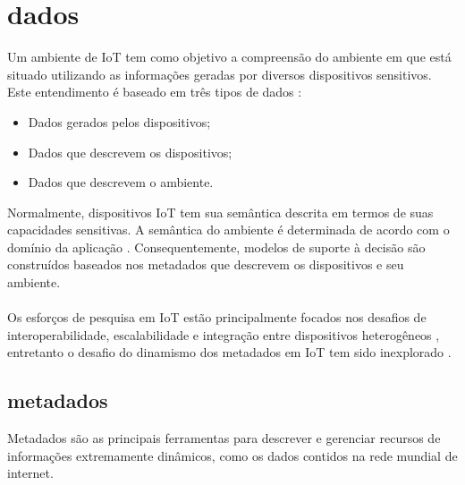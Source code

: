 \section{dados}%
	Um ambiente de \acrlong{IoT} tem como objetivo a compreensão do ambiente em que está situado utilizando as informações geradas por diversos
  dispositivos sensitivos.
   Este entendimento é baseado em três tipos de dados \cite{SemIOT}:
  \begin{itemize}
    \item Dados gerados pelos dispositivos;
    \item Dados que descrevem os dispositivos;
    \item Dados que descrevem o ambiente.
  \end{itemize}
  Normalmente, dispositivos \acrshort{IoT} tem sua semântica descrita em termos de suas capacidades sensitivas. A semântica do ambiente
  é determinada de acordo com o domínio da aplicação \cite{IOTdata}. Consequentemente, modelos de suporte à decisão são construídos
  baseados nos metadados que descrevem os dispositivos e seu ambiente.
  \\\\
  Os esforços de pesquisa em \acrlong{IoT} estão principalmente focados nos desafios de interoperabilidade, escalabilidade e integração entre dispositivos heterogêneos \cite{IOTdata},
  entretanto o desafio do dinamismo dos metadados em \acrshort{IoT} tem sido inexplorado \cite{collaborative}.

	\subsection{metadados}
  Metadados são as principais ferramentas para descrever e gerenciar recursos de informações extremamente dinâmicos, como os dados
  contidos na rede mundial de internet.

